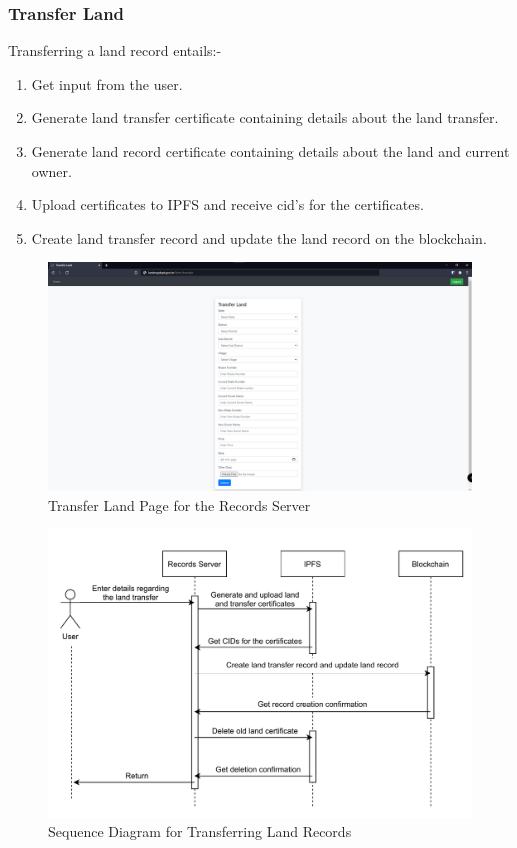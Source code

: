 \documentclass{article}
\begin{document}
        \subsubsection{Transfer Land}
            Transferring a land record entails:-
            \begin{enumerate}
                \item Get input from the user.
                \item Generate land transfer certificate containing details about the land transfer.
                \item Generate land record certificate containing details about the land and current owner.
                \item Upload certificates to IPFS and receive \gls{cid}'s for the certificates.
                \item Create land transfer record and update the land record on the blockchain.
            \end{enumerate}
            \begin{figure}[htbp]
                \includegraphics[scale=0.25]{records_transfer}
                \centering
                \caption{Transfer Land Page for the Records Server}
            \end{figure}

            \begin{figure}[htbp]
                \includegraphics[scale=0.25]{records_seq_transfer}
                \centering
                \caption{Sequence Diagram for Transferring Land Records}
            \end{figure}
\end{document}
